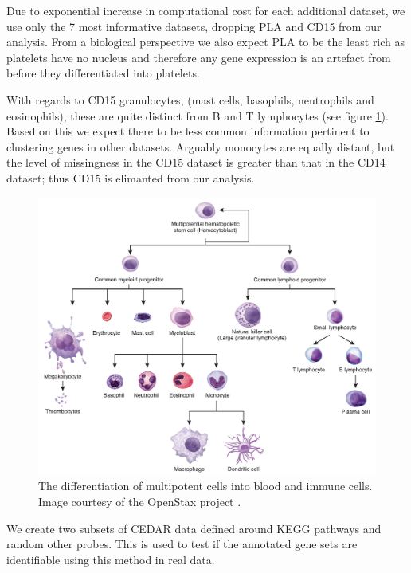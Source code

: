 \documentclass[12pt]{article} %
\begin{document}
	
	Due to exponential increase in computational cost for each additional dataset, we use only the 7 most informative datasets, dropping PLA and CD15 from our analysis. 
	From a biological perspective we also expect PLA to be the least rich as platelets have no nucleus \cite{Wrighthistogenesisbloodplatelets1910} and therefore any gene expression is an artefact from before they differentiated into platelets. 
	
	With regards to CD15 granulocytes, (mast cells, basophils, neutrophils and eosinophils), these are quite distinct from B and T lymphocytes (see figure \ref{fig:white_blood_cell_differentiation}). Based on this we expect there to be less common information pertinent to clustering genes in other datasets. Arguably monocytes are equally distant, but the level of missingness in the CD15 dataset is greater than that in the CD14 dataset; thus CD15 is elimanted from our analysis.

	\begin{figure}[h]
		\centering
		\includegraphics[scale=0.75]{Images/white_blood_cell_differentiation.jpg}
		\caption{The differentiation of multipotent cells into blood and immune cells. Image courtesy of the OpenStax project \cite{OpenStaxAnatomyPhysiology2016}.}
		\label{fig:white_blood_cell_differentiation}
	\end{figure}

	 We create two subsets of CEDAR data defined around KEGG pathways and random other probes. This is used to test if the annotated gene sets are identifiable using this method in real data.
	 
\end{document}
